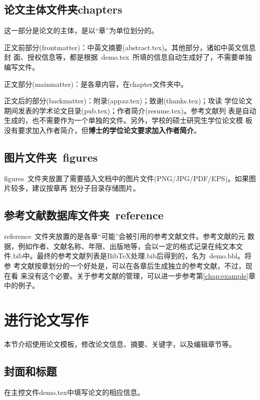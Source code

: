 \subsection{论文主体文件夹chapters}
\label{sec:thesisbody}

这一部分是论文的主体，是以``章''为单位划分的。

正文前部分(frontmatter)：中英文摘要(abstract.tex)。其他部分，诸如中英文信息封
面、授权信息等，都是根据~demo.tex~所填的信息自动生成好了，不需要单独编写文件。

正文部分(mainmatter)：是各章内容，在chapter文件夹中。

正文后的部分(backmatter)：附录(app\emph{xx}.tex)；致谢(thanks.tex)；攻读
学位论文期间发表的学术论文目录(pub.tex)；作者简介(resume.tex)。参考文献列
表是自动生成的，也不需要作为一个单独的文件。另外，学校的硕士研究生学位论文模
板没有要求加入作者简介，但\textbf{博士的学位论文要求加入作者简介}。


\subsection{图片文件夹~figures}
\label{sec:figuresdir}

figures~文件夹放置了需要插入文档中的图片文件(PNG/JPG/PDF/EPS)。如果图片较多，建议按章再
划分子目录存储图片。

\subsection{参考文献数据库文件夹~reference}
\label{sec:bibdir}

reference~文件夹放置的是各章``可能''会被引用的参考文献文件。参考文献的元
数据，例如作者、文献名称、年限、出版地等，会以一定的格式记录在纯文本文
件.bib中。最终的参考文献列表是BibTeX处理.bib后得到的，名为~demo.bbl。将参
考文献按章划分的一个好处是，可以在各章后生成独立的参考文献，不过，现在看
来没有这个必要。关于参考文献的管理，可以进一步参考第\ref{chap:example}章
中的例子。


\section{进行论文写作}
\label{sec:format}

本节介绍使用论文模板，修改论文信息、摘要、关键字，以及编辑章节等。

\subsection{封面和标题}
在主控文件demo.tex中填写论文的相应信息。

